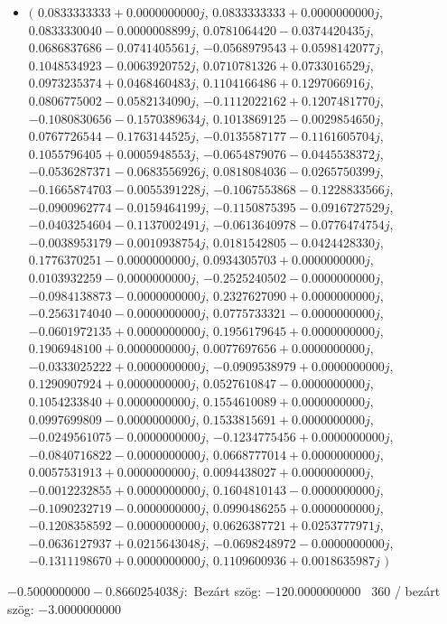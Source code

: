 \documentclass[14pt,a4paper]{article}
\begin{document}
\begin{itemize}
\item
$\big($
$0.0833333333+0.0000000000j$, $0.0833333333+0.0000000000j$, $0.0833330040-0.0000008899j$, $0.0781064420-0.0374420435j$, $0.0686837686-0.0741405561j$, $-0.0568979543+0.0598142077j$, $0.1048534923-0.0063920752j$, $0.0710781326+0.0733016529j$, $0.0973235374+0.0468460483j$, $0.1104166486+0.1297066916j$, $0.0806775002-0.0582134090j$, $-0.1112022162+0.1207481770j$, $-0.1080830656-0.1570389634j$, $0.1013869125-0.0029854650j$, $0.0767726544-0.1763144525j$, $-0.0135587177-0.1161605704j$, $0.1055796405+0.0005948553j$, $-0.0654879076-0.0445538372j$, $-0.0536287371-0.0683556926j$, $0.0818084036-0.0265750399j$, $-0.1665874703-0.0055391228j$, $-0.1067553868-0.1228833566j$, $-0.0900962774-0.0159464199j$, $-0.1150875395-0.0916727529j$, $-0.0403254604-0.1137002491j$, $-0.0613640978-0.0776474754j$, $-0.0038953179-0.0010938754j$, $0.0181542805-0.0424428330j$, $0.1776370251-0.0000000000j$, $0.0934305703+0.0000000000j$, $0.0103932259-0.0000000000j$, $-0.2525240502-0.0000000000j$, $-0.0984138873-0.0000000000j$, $0.2327627090+0.0000000000j$, $-0.2563174040-0.0000000000j$, $0.0775733321-0.0000000000j$, $-0.0601972135+0.0000000000j$, $0.1956179645+0.0000000000j$, $0.1906948100+0.0000000000j$, $0.0077697656+0.0000000000j$, $-0.0333025222+0.0000000000j$, $-0.0909538979+0.0000000000j$, $0.1290907924+0.0000000000j$, $0.0527610847-0.0000000000j$, $0.1054233840+0.0000000000j$, $0.1554610089+0.0000000000j$, $0.0997699809-0.0000000000j$, $0.1533815691+0.0000000000j$, $-0.0249561075-0.0000000000j$, $-0.1234775456+0.0000000000j$, $-0.0840716822-0.0000000000j$, $0.0668777014+0.0000000000j$, $0.0057531913+0.0000000000j$, $0.0094438027+0.0000000000j$, $-0.0012232855+0.0000000000j$, $0.1604810143-0.0000000000j$, $-0.1090232719-0.0000000000j$, $0.0990486255+0.0000000000j$, $-0.1208358592-0.0000000000j$, $0.0626387721+0.0253777971j$, $-0.0636127937+0.0215643048j$, $-0.0698248972-0.0000000000j$, $-0.1311198670+0.0000000000j$, $0.1109600936+0.0018635987j$
$\big)$
\end{itemize}
$-0.5000000000-0.8660254038j$:\
Bezárt szög: $-120.0000000000$ \
360 / bezárt szög: $-3.0000000000$\
\end{document}
